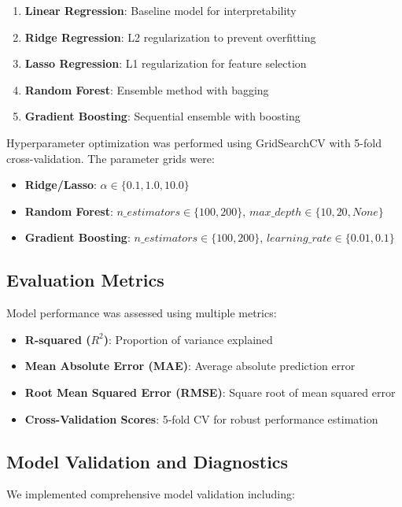 \documentclass[times, twoside, watermark]{zHenriquesLab-StyleBioRxiv}
\begin{document}
\begin{enumerate}
\item \textbf{Linear Regression}: Baseline model for interpretability
\item \textbf{Ridge Regression}: L2 regularization to prevent overfitting
\item \textbf{Lasso Regression}: L1 regularization for feature selection
\item \textbf{Random Forest}: Ensemble method with bagging
\item \textbf{Gradient Boosting}: Sequential ensemble with boosting
\end{enumerate}

Hyperparameter optimization was performed using GridSearchCV with 5-fold cross-validation. The parameter grids were:

\begin{itemize}
\item \textbf{Ridge/Lasso}: $\alpha \in \{0.1, 1.0, 10.0\}$
\item \textbf{Random Forest}: $n\_estimators \in \{100, 200\}$, $max\_depth \in \{10, 20, None\}$
\item \textbf{Gradient Boosting}: $n\_estimators \in \{100, 200\}$, $learning\_rate \in \{0.01, 0.1\}$
\end{itemize}

\subsection*{Evaluation Metrics}

Model performance was assessed using multiple metrics:

\begin{itemize}
\item \textbf{R-squared ($R^2$)}: Proportion of variance explained
\item \textbf{Mean Absolute Error (MAE)}: Average absolute prediction error
\item \textbf{Root Mean Squared Error (RMSE)}: Square root of mean squared error
\item \textbf{Cross-Validation Scores}: 5-fold CV for robust performance estimation
\end{itemize}

\subsection*{Model Validation and Diagnostics}

We implemented comprehensive model validation including:
\end{document}
